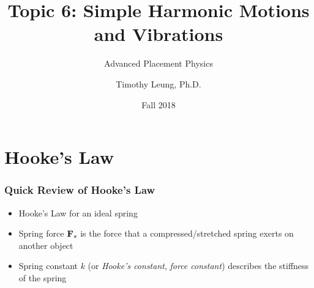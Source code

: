 \documentclass[12pt,compress,aspectratio=169]{beamer}
\title{Topic 6: Simple Harmonic Motions and Vibrations}
\subtitle{Advanced Placement Physics}
\author[TML]{Timothy Leung, Ph.D.}
\institute{Olympiads School}
\date{Fall 2018}
\newcommand{\mb}[1]{\ensuremath\mathbf{#1}}
\newcommand{\eq}[2]{\vspace{#1}{\Large\begin{displaymath}#2\end{displaymath}}}
\begin{document}
\begin{frame}
  \maketitle
\end{frame}

%
%


\section{Hooke's Law}
\begin{frame}
  \frametitle{Quick Review of Hooke's Law}
  \begin{itemize}
  \item Hooke's Law for an ideal spring

    \eq{-.2in}{
      \boxed{\mb{F}_s=-k\mb{x}}
    }
  \item Spring force $\mb{F}_s$ is the force that a compressed/stretched
    spring exerts on another object
  \item Spring constant $k$ (or \emph{Hooke's constant},
    \emph{force constant}) describes the stiffness of the spring
  \end{itemize}
\end{frame}
\end{document}
